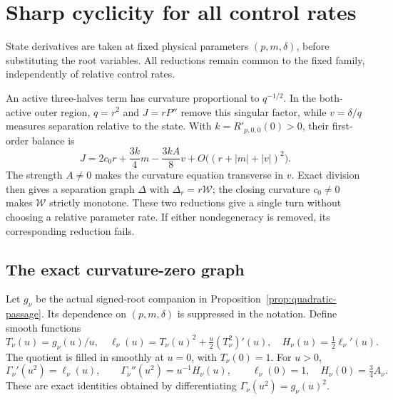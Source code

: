 \section{Sharp cyclicity for all control rates}
\label{sec:curvature-graph}

State derivatives are taken at fixed physical parameters $(p,m,\delta)$,
before substituting the root variables. All reductions remain common to
the fixed family, independently of relative control rates.

An active three-halves term has curvature proportional to \(q^{-1/2}\).
In the both-active outer region, \(q=r^2\) and \(J=rP''\) remove
this singular factor, while \(v=\delta/q\) measures separation relative
to the state. With \(k=R'_{p,0,0}(0)>0\), their first-order balance is
\[
 J=2c_0r+\frac{3k}{4}m-\frac{3kA}{8}v
       +O\bigl((r+|m|+|v|)^2\bigr).
\]
The strength $A\ne0$ makes the curvature equation transverse in $v$.
Exact division then gives a separation graph $\Delta$ with
$\Delta_r=r\mathcal W$; the closing curvature $c_0\ne0$ makes
$\mathcal W$ strictly monotone. These two reductions give a single turn
without choosing a relative parameter rate. If either nondegeneracy is
removed, its corresponding reduction fails.

\subsection{The exact curvature-zero graph}

Let \(g_\nu\) be the actual signed-root companion in
Proposition~\ref{prop:quadratic-passage}. Its dependence on
\((p,m,\delta)\) is suppressed in the notation. Define smooth functions
\begin{equation}\label{eq:root-profiles}
 T_\nu(u)=g_\nu(u)/u,\quad
 \ell_\nu(u)=T_\nu(u)^2+\tfrac{u}{2}(T_\nu^2)'(u),
 \quad H_\nu(u)=\tfrac12\ell_\nu'(u).
\end{equation}
The quotient is filled in smoothly at \(u=0\), with \(T_\nu(0)=1\).
For \(u>0\),
\begin{equation}\label{eq:passage-derivatives}
 \Gamma_\nu'(u^2)=\ell_\nu(u),\qquad
 \Gamma_\nu''(u^2)=u^{-1}H_\nu(u),\qquad
 \ell_\nu(0)=1,\quad H_\nu(0)=\tfrac34 A_\nu.
\end{equation}
These are exact identities obtained by differentiating
\(\Gamma_\nu(u^2)=g_\nu(u)^2\).


